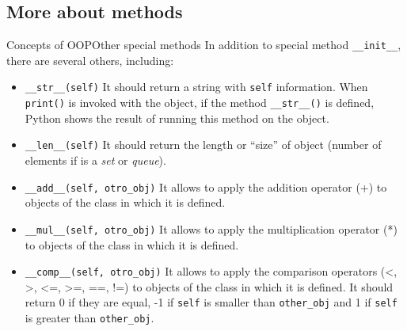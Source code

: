 \documentclass[10pt,compress]{beamer} %
\begin{document}
%		

\subsection{More about methods}

\begin{frame}{Concepts of OOP}{Other special methods}
In addition to special method \texttt{\_\_init\_\_}, there are several others, including:\\
	\begin{block}{}
		\vspace{-0.15cm}
		\begin{itemize}
		\item \footnotesize{\texttt{\_\_str\_\_(self)} It should return a string with \texttt{self} information.  When \texttt{print()} is invoked with the object, if the method \texttt{\_\_str\_\_()} is defined, Python shows the result of running this method on the object.}
		\item \footnotesize{\texttt{\_\_len\_\_(self)} It should return the length or ``size'' of object (number of elements if is a \textit{set} or \textit{queue}).}
		\item \footnotesize{\texttt{\_\_add\_\_(self, otro\_obj)} It allows to apply the addition operator (+) to objects of the class in which it is defined.}
		\item \footnotesize{\texttt{\_\_mul\_\_(self, otro\_obj)} It allows to apply the multiplication operator (*) to objects of the class in which it is defined.}
		\item \footnotesize{\texttt{\_\_comp\_\_(self, otro\_obj)} It allows to apply the comparison operators (<, >, <=, >=, ==, !=) to objects of the class in which it is defined. It should return 0 if they are equal, -1 if \texttt {self} is smaller than \texttt{other\_obj} and 1 if \texttt{self} is greater than \texttt{other\_obj}.}
		\end{itemize}
		\vspace{-0.2cm}
	\end{block}	
\end{frame}
\end{document}

